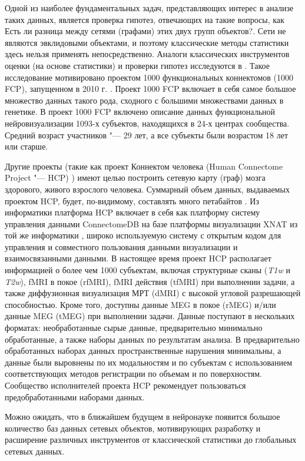 Одной из наиболее фундаментальных задач, представляющих интерес в анализе таких данных, является проверка гипотез, отвечающих на такие вопросы, как Есть ли разница между сетями (графами) этих двух групп объектов?. Сети не являются эвклидовыми объектами, и поэтому классические методы статистики здесь нельзя применять непосредственно. Аналоги классических инструментов оценки (на основе статистики) и проверки гипотез исследуются в \cite{ginestet2017hypothesis, ginestet2014statistical}. Такое исследование мотивировано проектом 1000 функциональных коннектомов (1000 FCP), запущенном в 2010 г. \cite{biswal2010toward}. Проект 1000 FCP \cite{yan2013standardizing} включает в себя самое большое множество данных такого рода, сходного с большими множествами данных в генетике. В проект 1000 FCP включено описание данных функциональной нейровизуализации 1093-х субъектов, находящихся в 24-х центрах сообщества. Средний возраст участников "--- 29 лет, а все субъекты были возрастом 18 лет или старше.


Другие проекты (такие как проект Коннектом человека (Human Connectome Project "--- HCP) \cite{VanEssen2013}) имеют целью построить сетевую карту (граф) мозга здорового, живого взрослого человека.
 Суммарный объем данных, выдаваемых проектом HCP, будет, по-видимому, составлять много петабайтов \cite{VanEssen2013}. Из информатики платформа HCP включает в себя как платформу систему управления данными ConnectomeDB на базе платформы визуализации XNAT из той же информатики \cite{marcus2007extensible}, широко используемую систему с открытым кодом для управления и совместного пользования данными визуализации и взаимосвязанными данными. В настоящее время проект HCP располагает информацией о более чем 1000 субъектам, включая структурные сканы (\textit{T1w} и \textit{T2w}), fMRI в покое (rfMRI), fMRI действия (tfMRI) при выполнении задачи, а также диффузионная визуализация МРТ (dMRI) с высокой угловой разрешающей способностью. Кроме того, доступны данные MEG в покое (rMEG) и/или данные MEG (tMEG) при выполнении задачи. Данные поступают в нескольких форматах: необработанные сырые данные, предварительно минимально обработанные, а также наборы данных по результатам анализа. В предварительно обработанных наборах данных пространственные нарушения минимальны, а данные были выровнены по их модальностям и по субъектам с использованием соответствующих методов регистрации по объемам и по поверхностям. Сообщество исполнителей проекта HCP рекомендует пользоваться предобработанными наборами данных. 

Можно ожидать, что в ближайшем будущем в нейронауке появится большое количество баз данных сетевых объектов, мотивирующих разработку и расширение различных инструментов от классической статистики до глобальных сетевых данных.

